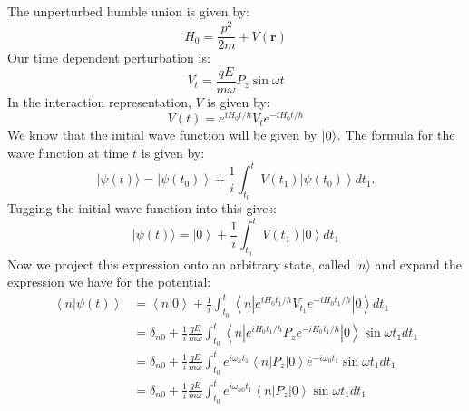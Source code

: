 \documentclass[12pt]{article}
\begin{document}
\subsection{}
The unperturbed humble union is given by:
\begin{equation}
H_{0}=\frac{p^{2}}{2 m}+V(\mathbf{r})
\end{equation}
Our time dependent perturbation is:
\begin{equation}
V_t = \frac{q E}{m \omega} P_{z} \sin \omega t
\end{equation}
In the interaction representation, $V$ is given by:
\begin{equation}
V(t)=e^{i H_{0} t / \hbar} V_{t} e^{-i H_{0} t / \hbar}
\end{equation}
We know that the initial wave function will be given by $\ket{0}$. 
The formula for the wave function at time $t$ is given by:
\begin{equation}
|\psi(t)\rangle=\left|\psi\left(t_0\right)\right\rangle+\frac{1}{i} \int_{t_0}^t V\left(t_1\right)\left|\psi\left(t_0\right)\right\rangle d t_1 .
\end{equation}
Tugging the initial wave function into this gives:
\begin{equation}
|\psi(t)\rangle=\left|0\right\rangle+\frac{1}{i} \int_{t_0}^t V\left(t_1\right)\left|0\right\rangle d t_1 
\end{equation}
Now we project this expression onto an arbitrary state, called $|n\rangle$ and expand the expression we have for the potential:
\begin{equation}
\begin{aligned}
\left\langle n|\psi(t)\right\rangle
&=\left\langle n|0\right\rangle+\frac{1}{i} \int_{t_0}^t\left\langle n\left|e^{i H_{0} t_1 / \hbar} V_{t_1} e^{-i H_{0} t_1 / \hbar}\right|0\right\rangle d t_1 \\
&=\delta _{n0}+\frac{1}{i} \frac{q E}{m \omega} \int_{t_0}^t\left\langle n\left|e^{i H_{0} t_1 / \hbar} P_{z} e^{-i H_{0} t_1 / \hbar}\right|0\right\rangle \sin \omega t_1 d t_1 \\
&= \delta _{n0}+\frac{1}{i} \frac{q E}{m \omega} \int_{t_0}^t e^{i\omega _n t_1} \left\langle n\left|P_{z}\right|0\right\rangle e^{-i\omega _0 t_1} \sin \omega t_1 d t_1\\
&= \delta _{n0}+\frac{1}{i} \frac{q E}{m \omega} \int_{t_0}^t e^{i \omega _{n0} t_1} \left\langle n\left|P_{z}\right|0\right\rangle \sin \omega t_1 d t_1
\end{aligned}
\end{equation}
\end{document}
